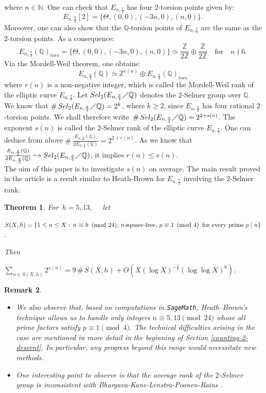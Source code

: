 \documentclass[11pt]{article}
\newcommand{\Z}{ {\mathbb{Z}} }
\newcommand{\Q}{ {\mathbb{Q}} }
\newtheorem{theorem}{Theorem}[section]
\newtheorem{remark}[theorem]{Remark}
\begin{document}
\noindent where $n\in \mathbb{N}$. One can check that $E_{n,\frac{\pi}{3}}$ has four $2$-torsion points given by:
$$E_{n,\frac{\pi}{3}}[2]= \lbrace \Theta, (0,0), (-3n,0), (n,0)\rbrace.$$
Moreover, one can also show that the $\Q$-torsion points of $E_{n,\frac{\pi}{3}}$ are the same as the $2$-torsion points. As a consequence:
$$E_{n,\frac{\pi}{3}}(\Q)_{tors}= \lbrace \Theta, (0,0), (-3n,0), (n,0)\rbrace \simeq\frac{\Z}{2\Z}\oplus \frac{\Z}{2\Z} \quad \text{for}\quad  n\nmid 6.$$
Via the Mordell-Weil theorem, one obtains:
$$E_{n,\frac{\pi}{3}}(\Q) \simeq \Z^{r(n)}\oplus E_{n,\frac{\pi}{3}}(\Q)_{tors}$$
where $r(n)$ is a non-negative integer, which is called the Mordell-Weil rank of the elliptic curve $E_{n,\frac{\pi}{3}}$. Let $Sel_{2}(E_{n,\frac{\pi}{3}}\diagup \Q)$ denotes the $2$-Selmer group over $\Q$. We know that  $\#\, Sel_{2}(E_{n,\frac{\pi}{3}}\diagup \Q) = 2^k$, where $k \geq 2$, since $E_{n,\frac{\pi}{3}}$ has four rational $2$-torsion points. We shall therefore write $\,\# \, Sel_{2}(E_{n,\frac{\pi}{3}}\diagup \Q) = 2^{2+s(n)}$. The exponent $s(n)$ is called the $2$-Selmer rank of the elliptic curve $E_{n,\frac{\pi}{3}}$. One can deduce from above $\#\: \frac{E_{n,\frac{\pi}{3}}(\Q)}{2E_{n,\frac{\pi}{3}}(\Q)}= 2^{2+r(n)}$. As we know that $\frac{E_{n,\frac{\pi}{3}}(\Q)}{2E_{n,\frac{\pi}{3}}(\Q)}\hookrightarrow Sel_{2}(E_{n,\frac{\pi}{3}}\diagup \Q)$, it implies $r(n)\leq s(n)$.\\ 


\noindent The aim of this paper is to investigate $s(n)$ on average. The main result proved in the article is a result similar to Heath-Brown for $E_{n,\frac{\pi}{3}}$ involving the $2$-Selmer rank.
\begin{theorem}{\label{maintheorem}}
For $\, h=5,13, \quad$ let
\begin{center}
$S(X,h)= \lbrace1\leq n\leq X :\,n\equiv h \pmod{24}, \,n\,\text{square-free},\, p\equiv 1 \pmod{4} \text{\, for every prime}\: p\mid n\rbrace$.
\end{center}
Then \begin{center} 
$\sum\limits_{n\in S(X,h)}2^{s(n)}= 9\,\#\, S(X,h)+ O(X(\log X)^{-\frac{5}{8}}(\log \log X)^{8})$.
\end{center}
\end{theorem}
\begin{remark}
\leavevmode

\begin{itemize}
\item  We also observe that, based on computations in \texttt{SageMath}, Heath--Brown's technique allows us to handle only integers  $n \equiv 5,13 \pmod{24}$ whose all prime factors satisfy $p \equiv 1 \pmod{4}$. The technical difficulties arising in the case are mentioned in more detail in the beginning of Section  \ref{counting 2-descent}. In particular, any progress beyond this range would necessitate new methods. 
\item One interesting point to observe is that the average rank of the $2$-Selmer group is inconsistent with Bhargava-Kane-Lenstra-Poonen-Rains \cite{BKLPR}.  
\end{itemize}
\end{remark}
\end{document}
